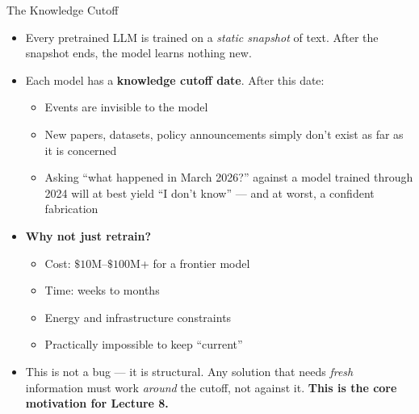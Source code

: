 \begin{frame}{The Knowledge Cutoff}
\begin{itemize}
\item Every pretrained LLM is trained on a \emph{static snapshot} of text. After the snapshot ends, the model learns nothing new.

\medskip
\item Each model has a \textbf{knowledge cutoff date}. After this date:
\begin{itemize}
    \item Events are invisible to the model
    \item New papers, datasets, policy announcements simply don't exist as far as it is concerned
    \item Asking ``what happened in March 2026?'' against a model trained through 2024 will at best yield ``I don't know'' --- and at worst, a confident fabrication
\end{itemize}

\medskip
\item \textbf{Why not just retrain?}
\begin{itemize}
    \item Cost: $\$10$M--$\$100$M+ for a frontier model
    \item Time: weeks to months
    \item Energy and infrastructure constraints
    \item Practically impossible to keep ``current''
\end{itemize}

\medskip
\item This is not a bug --- it is structural. Any solution that needs \emph{fresh} information must work \emph{around} the cutoff, not against it. \textbf{This is the core motivation for Lecture 8.}
\end{itemize}
\end{frame}

